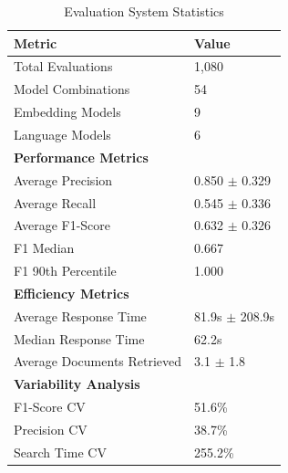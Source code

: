 \begin{table}
\caption{Evaluation System Statistics}
\label{tab:enhanced_system_stats}
\begin{tabular}{ll}
\toprule
Metric & Value \\
\midrule
Total Evaluations & 1,080 \\
Model Combinations & 54 \\
Embedding Models & 9 \\
Language Models & 6 \\
\midrule
\textbf{Performance Metrics} & \\
Average Precision & 0.850 $\pm$ 0.329 \\
Average Recall & 0.545 $\pm$ 0.336 \\
Average F1-Score & 0.632 $\pm$ 0.326 \\
F1 Median & 0.667 \\
F1 90th Percentile & 1.000 \\
\midrule
\textbf{Efficiency Metrics} & \\
Average Response Time & 81.9s $\pm$ 208.9s \\
Median Response Time & 62.2s \\
Average Documents Retrieved & 3.1 $\pm$ 1.8 \\
\midrule
\textbf{Variability Analysis} & \\
F1-Score CV & 51.6\% \\
Precision CV & 38.7\% \\
Search Time CV & 255.2\% \\
\bottomrule
\end{tabular}
\end{table}
